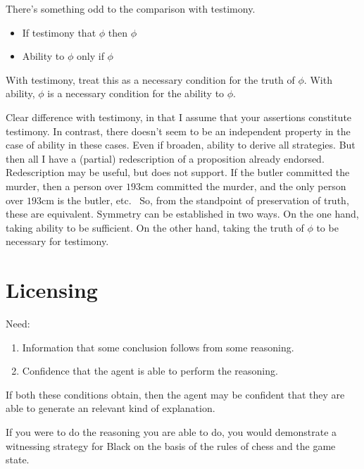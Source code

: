 \documentclass[10pt]{article}
\begin{document}
\begin{note}
  There's something odd to the comparison with testimony.
  \begin{itemize}
  \item If testimony that \(\phi\) then \(\phi\)
  \item Ability to \(\phi\) only if \(\phi\)
  \end{itemize}
  With testimony, treat this as a necessary condition for the truth of \(\phi\).
  With ability, \(\phi\) is a necessary condition for the ability to \(\phi\).

  {
    \color{green}
    Clear difference with testimony, in that I assume that your assertions constitute testimony.
    In contrast, there doesn't seem to be an independent property in the case of ability in these cases.
    Even if broaden, ability to derive all strategies.
    But then all I have a (partial) redescription of a proposition already endorsed.
    Redescription may be useful, but does not support.
    If the butler committed the murder, then a person over \(193\)cm committed the murder, and the only person over \(193\)cm is the butler, etc.\
  }
  So, from the standpoint of preservation of truth, these are equivalent.
  Symmetry can be established in two ways.
  On the one hand, taking ability to be sufficient.
  On the other hand, taking the truth of \(\phi\) to be necessary for testimony.
\end{note}

\newpage

\section{Licensing}
\label{sec:licensing}

\begin{note}
  Need:
  \begin{enumerate}
  \item Information that some conclusion follows from some reasoning.
  \item Confidence that the agent is able to perform the reasoning.
  \end{enumerate}
  If both these conditions obtain, then the agent may be confident that they are able to generate an {\color{red} relevant kind of} explanation.
\end{note}

If you were to do the reasoning you are able to do, you would demonstrate a witnessing strategy for Black on the basis of the rules of chess and the game state.
\end{document}
